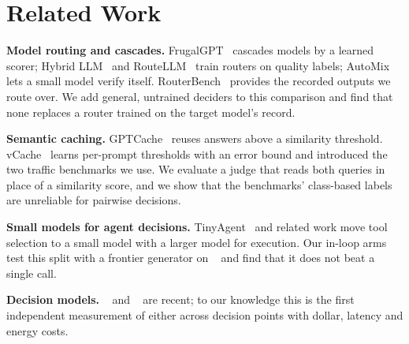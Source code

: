 \section{Related Work}
\label{sec:related}


\textbf{Model routing and cascades.}
FrugalGPT~\cite{chen2023frugalgpt} cascades models by a learned scorer; Hybrid LLM~\cite{ding2024hybrid} and RouteLLM~\cite{ong2024routellm} train routers on quality labels; AutoMix~\cite{aggarwal2023automix} lets a small model verify itself.
RouterBench~\cite{hu2024routerbench} provides the recorded outputs we route over.
We add general, untrained deciders to this comparison and find that none replaces a router trained on the target model's record.

\textbf{Semantic caching.}
GPTCache~\cite{bang2023gptcache} reuses answers above a similarity threshold.
vCache~\cite{schroeder2025vcache} learns per-prompt thresholds with an error bound and introduced the two traffic benchmarks we use.
We evaluate a judge that reads both queries in place of a similarity score, and we show that the benchmarks' class-based labels are unreliable for pairwise decisions.

\textbf{Small models for agent decisions.}
TinyAgent~\cite{erdogan2024tinyagent} and related work move tool selection to a small model with a larger model for execution.
Our in-loop arms test this split with a frontier generator on \taubench~\cite{yao2024taubench,barres2025tau2} and find that it does not beat a single call.

\textbf{Decision models.}
\jev~\cite{typesafe2026jev} and \kev~\cite{palmer2026kev} are recent; to our knowledge this is the first independent measurement of either across decision points with dollar, latency and energy costs.
